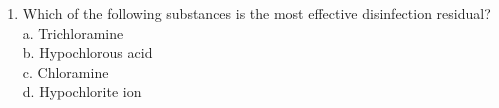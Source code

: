 \begin{enumerate}[1.]
\item Which of the following substances is the most effective disinfection residual?\\
a.	Trichloramine\\
b.	Hypochlorous acid\\
c.	Chloramine\\
d.	Hypochlorite  ion
\end{enumerate}
\newpage

